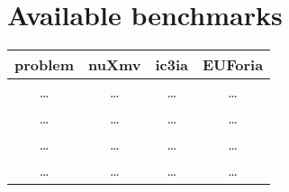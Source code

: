 \chapter{Available benchmarks}
\begin{center}
    
\begin{tabular}{ |c|c|c|c| }
    \hline
    problem & nuXmv & ic3ia & EUForia \\
    \hline
    \dots&\dots&\dots&\dots\\
    \dots&\dots&\dots&\dots\\
    \dots&\dots&\dots&\dots\\
    \dots&\dots&\dots&\dots\\
    \hline
\end{tabular}
\end{center}

